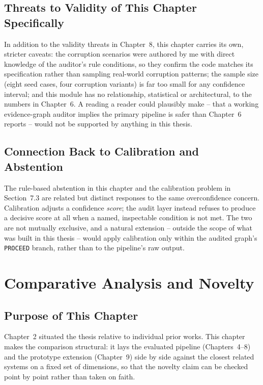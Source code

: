 \documentclass[12pt,a4paper,openany]{report}
\begin{document}
\section{Threats to Validity of This Chapter Specifically}
In addition to the validity threats in Chapter~8, this chapter carries its own, stricter caveats: the corruption scenarios were authored by me with direct knowledge of the auditor's rule conditions, so they confirm the code matches its specification rather than sampling real-world corruption patterns; the sample size (eight seed cases, four corruption variants) is far too small for any confidence interval; and this module has no relationship, statistical or architectural, to the numbers in Chapter~6. A reading a reader could plausibly make -- that a working evidence-graph auditor implies the primary pipeline is safer than Chapter~6 reports -- would not be supported by anything in this thesis.

\section{Connection Back to Calibration and Abstention}
The rule-based abstention in this chapter and the calibration problem in Section~7.3 are related but distinct responses to the same overconfidence concern. Calibration adjusts a confidence \emph{score}; the audit layer instead refuses to produce a decisive score at all when a named, inspectable condition is not met. The two are not mutually exclusive, and a natural extension -- outside the scope of what was built in this thesis -- would apply calibration only within the audited graph's \texttt{PROCEED} branch, rather than to the pipeline's raw output.

\chapter{Comparative Analysis and Novelty}
\section{Purpose of This Chapter}
Chapter~2 situated the thesis relative to individual prior works. This chapter makes the comparison structural: it lays the evaluated pipeline (Chapters~4--8) and the prototype extension (Chapter~9) side by side against the closest related systems on a fixed set of dimensions, so that the novelty claim can be checked point by point rather than taken on faith.
\end{document}
